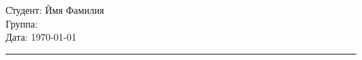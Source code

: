 \begin{tabbing}
\hspace{11cm} \= Студент: \= Имя Фамилия \\
  \> Группа: \>  \\
  \> Дата: \> \today
\end{tabbing}
\hrule
\vspace{1cm}

